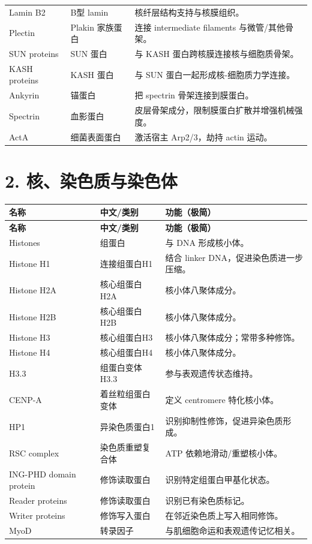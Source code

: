 \documentclass[11pt,fontset=none]{ctexart}
\begin{document}
\begin{longtable}{L{3.2cm} L{3.8cm} L{8.5cm}}
Lamin B2 & B型 lamin & 核纤层结构支持与核膜组织。 \\
Plectin & Plakin 家族蛋白 & 连接 intermediate filaments 与微管/其他骨架。 \\
SUN proteins & SUN 蛋白 & 与 KASH 蛋白跨核膜连接核与细胞质骨架。 \\
KASH proteins & KASH 蛋白 & 与 SUN 蛋白一起形成核-细胞质力学连接。 \\
Ankyrin & 锚蛋白 & 把 spectrin 骨架连接到膜蛋白。 \\
Spectrin & 血影蛋白 & 皮层骨架成分，限制膜蛋白扩散并增强机械强度。 \\
ActA & 细菌表面蛋白 & 激活宿主 Arp2/3，劫持 actin 运动。 \\
\end{longtable}

\section*{2. 核、染色质与染色体}
\begin{longtable}{L{3.2cm} L{3.8cm} L{8.5cm}}
\toprule
\textbf{名称} & \textbf{中文/类别} & \textbf{功能（极简）} \\
\midrule
\endfirsthead
\toprule
\textbf{名称} & \textbf{中文/类别} & \textbf{功能（极简）} \\
\midrule
\endhead
\bottomrule
\endfoot
Histones & 组蛋白 & 与 DNA 形成核小体。 \\
Histone H1 & 连接组蛋白H1 & 结合 linker DNA，促进染色质进一步压缩。 \\
Histone H2A & 核心组蛋白H2A & 核小体八聚体成分。 \\
Histone H2B & 核心组蛋白H2B & 核小体八聚体成分。 \\
Histone H3 & 核心组蛋白H3 & 核小体八聚体成分；常带多种修饰。 \\
Histone H4 & 核心组蛋白H4 & 核小体八聚体成分。 \\
H3.3 & 组蛋白变体H3.3 & 参与表观遗传状态维持。 \\
CENP-A & 着丝粒组蛋白变体 & 定义 centromere 特化核小体。 \\
HP1 & 异染色质蛋白1 & 识别抑制性修饰，促进异染色质形成。 \\
RSC complex & 染色质重塑复合体 & ATP 依赖地滑动/重塑核小体。 \\
ING-PHD domain protein & 修饰读取蛋白 & 识别特定组蛋白甲基化状态。 \\
Reader proteins & 修饰读取蛋白 & 识别已有染色质标记。 \\
Writer proteins & 修饰写入蛋白 & 在邻近染色质上写入相同修饰。 \\
MyoD & 转录因子 & 与肌细胞命运和表观遗传记忆相关。 \\
\end{longtable}
\end{document}
